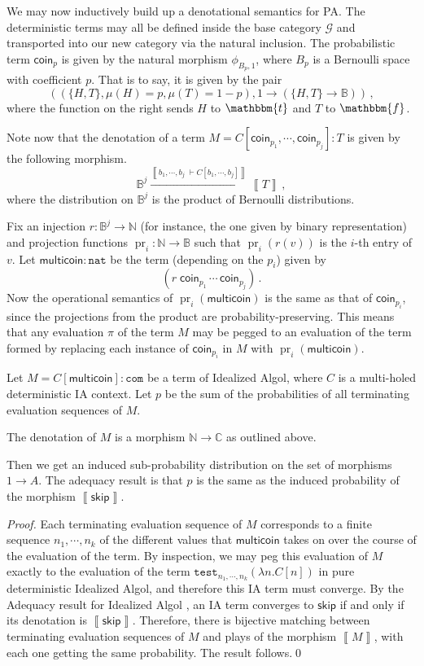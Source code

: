 \documentclass{svproc}
\newcommand{\deno}[1]{\left\llbracket#1\right\rrbracket}
\renewcommand{\ts}{{\;\vdash}}
\newcommand\G{\mathcal{G}}
\DeclareMathOperator\pr{pr}
\newcommand{\test}{\texttt{test}}
\newcommand{\nat}{{\mathtt{nat}}}
\newcommand*\from{\colon}
\newcommand{\0}{{\mathtt{0}}} \newcommand{\com}{{\mathtt{com}}}
\newcommand{\skipp}{{\mathsf{skip}}}
\newcommand{\true}{\mathbbm{t}}
\newcommand{\false}{\mathbbm{f}}
\newcommand{\bN}{\mathbb{N}}
\newcommand{\bB}{\mathbb{B}}
\newcommand{\bC}{\mathbb{C}}
\newcommand{\coin}{\textsf{coin}}
\newcommand{\multicoin}{\textsf{multicoin}}
\begin{document}
We may now inductively build up a denotational semantics for PA.  
The deterministic terms may all be defined inside the base category $\G$ and transported into our new category via the natural inclusion.  
The probabilistic term $\coin_p$ is given by the natural morphism $\phi_{B_p, 1}$, where $B_p$ is a Bernoulli space with coefficient $p$.  
That is to say, it is given by the pair
\[
  ((\{H,T\}, \mu(H)=p, \mu(T)=1-p), 1 \to (\{H,T\} \to \bB))\,,
  \]
where the function on the right sends $H$ to $\true$ and $T$ to $\false$.

Note now that the denotation of a term $M = C[\coin_{p_1},\cdots,\coin_{p_j}]\from T$ is given by the following morphism.
\[
  \bB^j
  \xrightarrow{\deno{b_1,\cdots,b_j\ts C[b_1,\cdots,b_j]}}
  \deno{T}\,,
  \]
where the distribution on $\bB^j$ is the product of Bernoulli distributions.

Fix an injection $r\from\bB^j\to \bN$ (for instance, the one given by binary representation) and projection functions $\pr_i \from \bN \to \bB$ such that $\pr_i(r(v))$ is the $i$-th entry of $v$.
Let $\multicoin\from\nat$ be the term (depending on the $p_i$) given by
\[
  (r\;\coin_{p_1}\,\cdots\,\coin_{p_j})\,.
  \]
Now the operational semantics of $\pr_i(\multicoin)$ is the same as that of $\coin_{p_i}$, since the projections from the product are probability-preserving.  
This means that any evaluation $\pi$ of the term $M$ may be pegged to an evaluation of the term formed by replacing each instance of $\coin_{p_i}$ in $M$ with $\pr_i(\multicoin)$.

\begin{proposition}
  Let $M = C[\multicoin]\from \com$ be a term of Idealized Algol, where $C$ is a multi-holed deterministic IA context.
  Let $p$ be the sum of the probabilities of all terminating evaluation sequences of $M$.

  The denotation of $M$ is a morphism $\bN \to \bC$ as outlined above.

  Then we get an induced sub-probability distribution on the set of morphisms $1\to A$.  
  The adequacy result is that $p$ is the same as the induced probability of the morphism $\deno{\skipp}$.
\end{proposition}
\begin{proof}
  Each terminating evaluation sequence of $M$ corresponds to a finite sequence $n_1,\cdots,n_k$ of the different values that $\multicoin$ takes on over the course of the evaluation of the term.  
  By inspection, we may peg this evaluation of $M$ exactly to the evaluation of the term $\test_{n_1,\cdots,n_k} (\lambda n.C[n])$ in pure deterministic Idealized Algol, and therefore this IA term must converge.  
  By the Adequacy result for Idealized Algol \cite{SamsonGuyIAPassive}, an IA term converges to $\skipp$ if and only if its denotation is $\deno{\skipp}$.  
  Therefore, there is bijective matching between terminating evaluation sequences of $M$ and plays of the morphism $\deno{M}$, with each one getting the same probability.  
  The result follows.\qed
\end{proof}
\end{document}
